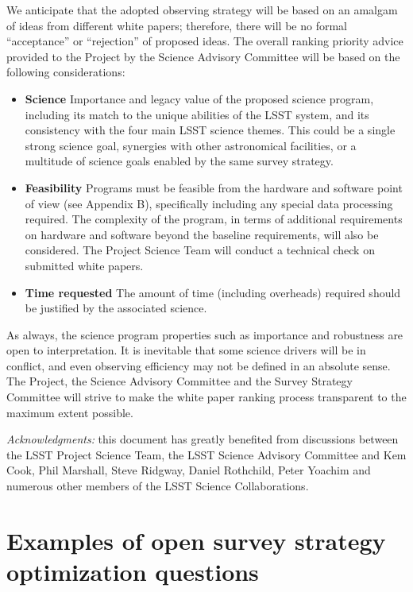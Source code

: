 \documentclass[DM,lsstdraft,toc,usenatbib]{lsstdoc}
\begin{document}
We anticipate that the adopted observing strategy will be based on an amalgam of ideas from 
different white papers; therefore, there will be no formal ``acceptance'' or ``rejection'' of
proposed ideas. The overall ranking priority advice provided to the Project by the Science Advisory Committee 
will be based on the following considerations: 
\begin{itemize}
\item {\bf Science} Importance and legacy value of the proposed science program, including 
           its match to the unique abilities of the LSST system, and its consistency with the 
           four main LSST science themes. This could be a single strong science goal, synergies with
           other astronomical facilities, or a multitude of science goals enabled by the same survey strategy. 
\item {\bf Feasibility} Programs must be feasible from the hardware and software point of view (see Appendix B),
         specifically including any special data processing required. The complexity of the program, in terms of additional
         requirements on hardware and software beyond the baseline requirements, will also be considered. 
         The Project Science Team will conduct a technical check on submitted white papers.
\item {\bf Time requested} The amount of time (including overheads) required should be justified by 
        the associated science. 
\end{itemize} 

As always, the science program properties such as importance and robustness are open
to interpretation. It is inevitable that some science drivers will be in conflict, and even
observing efficiency may not be defined in an absolute sense. The Project, the Science Advisory 
Committee and the Survey Strategy Committee will strive to make the white paper ranking process 
transparent to the maximum extent possible. 

\vskip 0.2in 
{\it Acknowledgments:} this document has greatly benefited from discussions between 
the LSST Project Science Team, the LSST Science Advisory Committee and Kem Cook, 
Phil Marshall, Steve Ridgway, Daniel Rothchild, Peter Yoachim and numerous other members 
of the LSST Science Collaborations. 

\newpage
\appendix
\section{Examples of open survey strategy optimization questions \label{sec:optimization}} 
\end{document}
